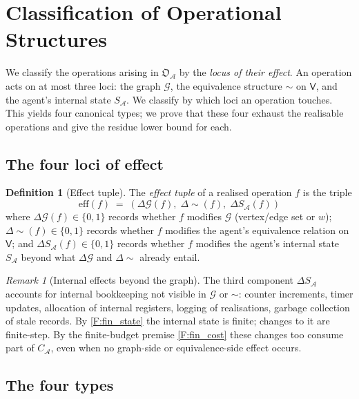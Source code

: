 \documentclass[11pt,twocolumn,a4paper]{article}
\theoremstyle{thmstyle}
\theoremstyle{definition}
\newtheorem{definition}[theorem]{Definition}
\theoremstyle{remark}
\newtheorem{remark}[theorem]{Remark}
\newcommand{\Graph}{\mathcal{G}}
\newcommand{\Vrt}{\mathsf{V}}
\newcommand{\Agent}{\mathcal{A}}
\newcommand{\OpStr}{\mathfrak{O}}
\begin{document}
\section{Classification of Operational Structures}
\label{sec:classification}

We classify the operations arising in $\OpStr_\Agent$ by the
\emph{locus of their effect}. An operation acts on at most three
loci: the graph $\Graph$, the equivalence structure
$\sim$ on $\Vrt$, and the agent's internal state $S_\Agent$. We
classify by which loci an operation touches. This yields four
canonical types; we prove that these four exhaust the realisable
operations and give the residue lower bound for each.

\subsection{The four loci of effect}

\begin{definition}[Effect tuple]
\label{def:effect_tuple}
The \emph{effect tuple} of a realised operation $f$ is the triple
\[
  \mathrm{eff}(f) \;=\; (\Delta\Graph(f),\; \Delta{\sim}(f),\;
  \Delta S_\Agent(f))
\]
where $\Delta\Graph(f) \in \{0, 1\}$ records whether $f$ modifies
$\Graph$ (vertex/edge set or $w$); $\Delta{\sim}(f) \in \{0, 1\}$
records whether $f$ modifies the agent's equivalence relation on
$\Vrt$; and $\Delta S_\Agent(f) \in \{0, 1\}$ records whether $f$
modifies the agent's internal state $S_\Agent$ beyond what
$\Delta\Graph$ and $\Delta{\sim}$ already entail.
\end{definition}

\begin{remark}[Internal effects beyond the graph]
\label{rem:internal_beyond}
The third component $\Delta S_\Agent$ accounts for internal
bookkeeping not visible in $\Graph$ or $\sim$: counter increments,
timer updates, allocation of internal registers, logging of
realisations, garbage collection of stale records. By
\cref{F:fin_state} the internal state is finite; changes to it are
finite-step. By the finite-budget premise \cref{F:fin_cost} these
changes too consume part of $C_\Agent$, even when no
graph-side or equivalence-side effect occurs.
\end{remark}

\subsection{The four types}
\end{document}
